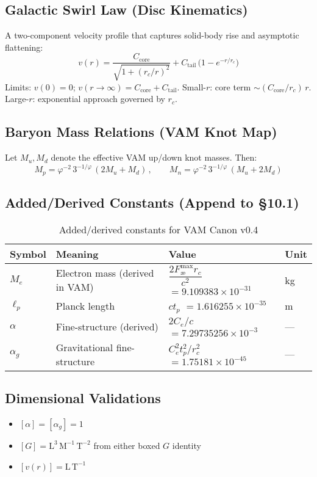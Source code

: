 \documentclass[11pt]{article}
\begin{document}
\subsection{Galactic Swirl Law (Disc Kinematics)}
A two-component velocity profile that captures solid-body rise and asymptotic flattening:
\[
    \boxed{v(r) = \frac{C_{\text{core}}}{\sqrt{1 + (r_c/r)^2}} + C_{\text{tail}}\,\big(1 - e^{-r/r_c}\big)}
\]
Limits: $v(0)=0$; $v(r\to\infty)=C_{\text{core}}+C_{\text{tail}}$. Small-$r$: core term $\sim (C_{\text{core}}/r_c)\,r$. Large-$r$: exponential approach governed by $r_c$.

\subsection{Baryon Mass Relations (VAM Knot Map)}
Let $M_u, M_d$ denote the effective VAM up/down knot masses. Then:
\[
    \boxed{M_p = \varphi^{-2}\,3^{-1/\varphi}\,(2 M_u + M_d)}\,,\qquad
    \boxed{M_n = \varphi^{-2}\,3^{-1/\varphi}\,(M_u + 2 M_d)}
\]

\subsection{Added/Derived Constants (Append to \S10.1)}
\begin{table}[h!]
    \centering
    \begin{tabular}{|l|l|l|l|}
        \hline
        \textbf{Symbol} & \textbf{Meaning} & \textbf{Value} & \textbf{Unit} \\
        \hline
        $M_e$ & Electron mass (derived in VAM) & $\dfrac{2 F_{\text{\ae}}^{\max} r_c}{c^2}$ $= 9.109383\times10^{-31}$ & kg \\
        $\ell_p$ & Planck length & $c t_p$ $= 1.616255\times10^{-35}$ & m \\
        $\alpha$ & Fine-structure (derived) & $2C_e/c$ $= 7.29735256\times10^{-3}$ & --- \\
        $\alpha_g$ & Gravitational fine-structure & $C_e^{2} t_p^{2}/r_c^{2}$ $= 1.75181\times10^{-45}$ & --- \\
        \hline
    \end{tabular}
    \caption{Added/derived constants for VAM Canon v0.4}
    \label{tab:added-derived-constants}
\end{table}

\subsection{Dimensional Validations}
\begin{itemize}
    \item $[\alpha]=[\alpha_g]=1$
    \item $[G]=\mathrm{L}^3\,\mathrm{M}^{-1}\,\mathrm{T}^{-2}$ from either boxed $G$ identity
    \item $[v(r)]=\mathrm{L}\,\mathrm{T}^{-1}$
\end{itemize}
\end{document}
